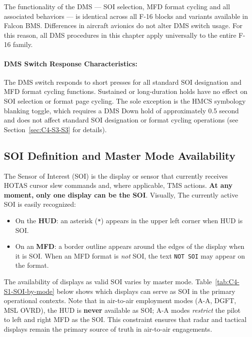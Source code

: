 \documentclass[11pt, a4paper, twoside]{report}
\begin{document}
The functionality of the DMS --- SOI selection, MFD format cycling and all associated behaviors --- is identical across all F-16 blocks and variants available in Falcon BMS. Differences in aircraft avionics do not alter DMS switch usage. For this reason, all DMS procedures in this chapter apply universally to the entire F-16 family.

\paragraph*{DMS Switch Response Characteristics:}

The DMS switch responds to short presses for all standard SOI designation and MFD format cycling functions. Sustained or long-duration holds have no effect on SOI selection or format page cycling. The sole exception is the HMCS symbology blanking toggle, which requires a DMS Down hold of approximately 0.5 second and does not affect standard SOI designation or format cycling operations (see Section~\ref{sec:C4-S3-S3} for details).

\subsection{SOI Definition and Master Mode Availability}
\label{sec:C4-S1-S1}

The Sensor of Interest (SOI) is the display or sensor that currently receives HOTAS cursor slew commands and, where applicable, TMS actions. \textbf{At any moment, only one display can be the SOI}. Visually, The currently active SOI is easily recognized:

\begin{itemize}
	\item On the \textbf{HUD}: an asterisk (\texttt{*}) appears in the upper left corner when HUD is SOI.
	\item On an \textbf{MFD}: a border outline appears around the edges of the display when it is SOI. When an MFD format is \textit{not} SOI, the text \texttt{NOT SOI} may appear on the format.
\end{itemize}

The availability of displays as valid SOI varies by master mode. Table~\ref{tab:C4-S1-SOI-by-mode} below shows which displays can serve as SOI in the primary operational contexts. Note that in air-to-air employment modes (A-A, DGFT, MSL OVRD), the HUD is \textbf{never} available as SOI; A-A modes \textit{restrict} the pilot to left and right MFD as the SOI. This constraint ensures that radar and tactical displays remain the primary source of truth in air-to-air engagements.
\end{document}
